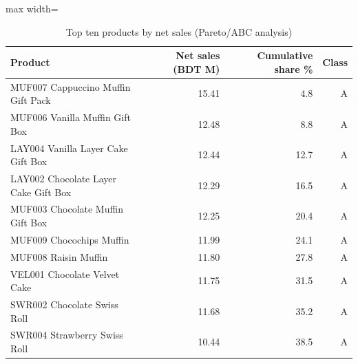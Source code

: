 \begin{table}[htbp]
\centering
\small
\caption{Top ten products by net sales (Pareto/ABC analysis)}
\label{tab:topproducts}
\begin{adjustbox}{max width=\linewidth}
\begin{tabular}{lrrr}
\toprule
\textbf{Product} & \textbf{Net sales (BDT M)} & \textbf{Cumulative share \%} & \textbf{Class} \\
\midrule
MUF007 Cappuccino Muffin Gift Pack & 15.41 & 4.8 & A \\
MUF006 Vanilla Muffin Gift Box & 12.48 & 8.8 & A \\
LAY004 Vanilla Layer Cake Gift Box & 12.44 & 12.7 & A \\
LAY002 Chocolate Layer Cake Gift Box & 12.29 & 16.5 & A \\
MUF003 Chocolate Muffin Gift Box & 12.25 & 20.4 & A \\
MUF009 Chocochips Muffin & 11.99 & 24.1 & A \\
MUF008 Raisin Muffin & 11.80 & 27.8 & A \\
VEL001 Chocolate Velvet Cake & 11.75 & 31.5 & A \\
SWR002 Chocolate Swiss Roll & 11.68 & 35.2 & A \\
SWR004 Strawberry Swiss Roll & 10.44 & 38.5 & A \\
\bottomrule
\end{tabular}
\end{adjustbox}
\end{table}
